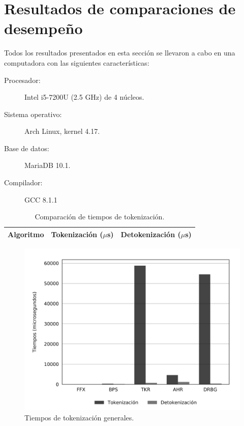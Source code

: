 %
%
%

\section{Resultados de comparaciones de desempeño}

Todos los resultados presentados en esta sección se llevaron a cabo en una
computadora con las siguientes características:

\begin{description}
    \item[Procesador:] Intel i5-7200U (2.5 GHz) de 4 núcleos.
    \item[Sistema operativo:] Arch Linux, kernel 4.17.
    \item[Base de datos:] MariaDB 10.1.
    \item[Compilador:] GCC 8.1.1
\end{description}

\begin{table}
  \begin{center}
    \begin{tabular}{|c|c|c|}
      \hline
      Algoritmo & Tokenización ($\mu$s) & Detokenización ($\mu$s) \\
      \hline
      
    \end{tabular}
    \caption{Comparación de tiempos de tokenización.}
    \label{tabla:tiempos_tokenizacion}
  \end{center}
\end{table}

\begin{figure}
  \begin{center}
    \includegraphics[width=1.0\linewidth]
      {../implementaciones/reportes/tiempos_unitarios.png}
    \caption{Tiempos de tokenización generales.}
  \end{center}
\end{figure}
